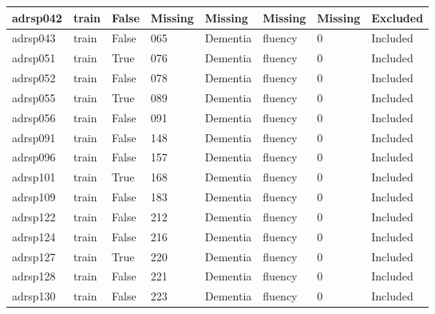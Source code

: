 \begin{center}
\begin{longtable}{|l|l|l|l|l|l|l|l|}
adrsp042       & train                 & False             & Missing & Missing        & Missing         & Missing      & Excluded      \\ \hline
adrsp043       & train                 & False             & 065     & Dementia       & fluency         & 0            & Included      \\ \hline
adrsp051       & train                 & True              & 076     & Dementia       & fluency         & 0            & Included      \\ \hline
adrsp052       & train                 & False             & 078     & Dementia       & fluency         & 0            & Included      \\ \hline
adrsp055       & train                 & True              & 089     & Dementia       & fluency         & 0            & Included      \\ \hline
adrsp056       & train                 & False             & 091     & Dementia       & fluency         & 0            & Included      \\ \hline
adrsp091       & train                 & False             & 148     & Dementia       & fluency         & 0            & Included      \\ \hline
adrsp096       & train                 & False             & 157     & Dementia       & fluency         & 0            & Included      \\ \hline
adrsp101       & train                 & True              & 168     & Dementia       & fluency         & 0            & Included      \\ \hline
adrsp109       & train                 & False             & 183     & Dementia       & fluency         & 0            & Included      \\ \hline
adrsp122       & train                 & False             & 212     & Dementia       & fluency         & 0            & Included      \\ \hline
adrsp124       & train                 & False             & 216     & Dementia       & fluency         & 0            & Included      \\ \hline
adrsp127       & train                 & True              & 220     & Dementia       & fluency         & 0            & Included      \\ \hline
adrsp128       & train                 & False             & 221     & Dementia       & fluency         & 0            & Included      \\ \hline
adrsp130       & train                 & False             & 223     & Dementia       & fluency         & 0            & Included      \\ \hline

\end{longtable}
\end{center}
